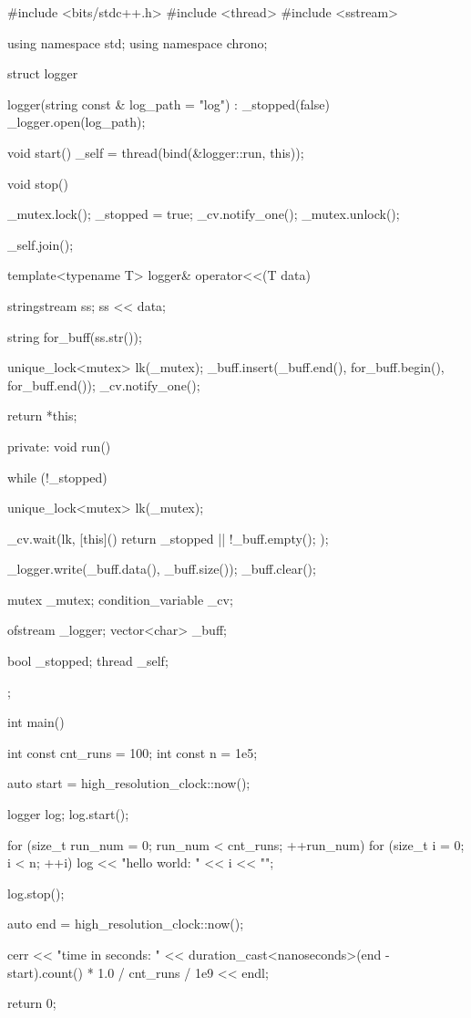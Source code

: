 #include <bits/stdc++.h>
#include <thread>
#include <sstream>

using namespace std;
using namespace chrono;

struct logger {

    logger(string const & log_path = "log") 
        : _stopped(false)
    {
        _logger.open(log_path);
    }

    void start() {
        _self = thread(bind(&logger::run, this));
    }

    void stop() {
        _mutex.lock();
        _stopped = true;
        _cv.notify_one();
        _mutex.unlock();

        _self.join();
    }

    template<typename T>
    logger& operator<<(T data) {
        stringstream ss;
        ss << data;

        string for_buff(ss.str());

        unique_lock<mutex> lk(_mutex);
        _buff.insert(_buff.end(), for_buff.begin(), for_buff.end());
        _cv.notify_one();

        return *this;
    }

private:
    void run() {
        while (!_stopped) {
            unique_lock<mutex> lk(_mutex);

            _cv.wait(lk, [this]() { return _stopped || !_buff.empty(); });

            _logger.write(_buff.data(), _buff.size());
            _buff.clear();
        }
    }

    mutex _mutex;
    condition_variable _cv;

    ofstream _logger;
    vector<char> _buff;

    bool _stopped;
    thread _self;
};

int main() {
    int const cnt_runs = 100;
    int const n = 1e5;

    auto start = high_resolution_clock::now();

    logger log;
    log.start();

    for (size_t run_num = 0; run_num < cnt_runs; ++run_num) {
        for (size_t i = 0; i < n; ++i) {
            log << "hello world: " << i << "\n";
        }
    }

    log.stop();

    auto end = high_resolution_clock::now();

    cerr << "time in seconds: " << duration_cast<nanoseconds>(end - start).count() * 1.0 / cnt_runs / 1e9 << endl;

    return 0;    
}
